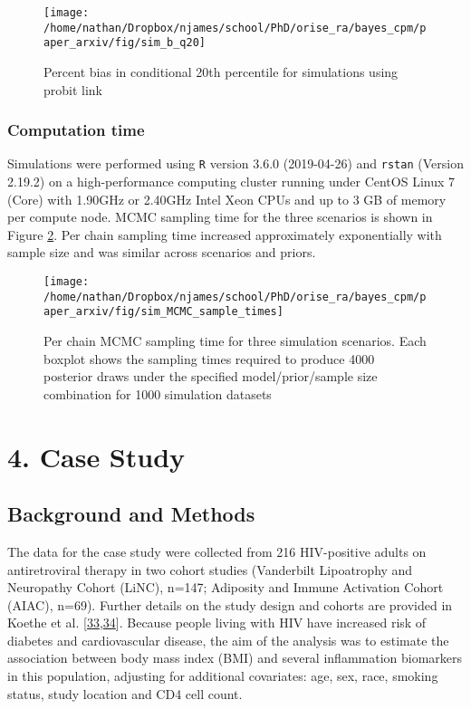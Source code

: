 \documentclass[
]{article}
\begin{document}
\begin{figure}

{\centering \texttt{[image: /home/nathan/Dropbox/njames/school/PhD/orise\_ra/bayes\_cpm/paper\_arxiv/fig/sim\_b\_q20]} 

}

\caption{Percent bias in conditional 20th percentile for simulations using probit link}\label{fig:simplt-q20-a}
\end{figure}

\hypertarget{computation-time}{%
\subsubsection{Computation time}\label{computation-time}}

Simulations were performed using \texttt{R} version 3.6.0 (2019-04-26) and \texttt{rstan} (Version 2.19.2) on a high-performance computing cluster running under CentOS Linux 7 (Core) with 1.90GHz or 2.40GHz Intel Xeon CPUs and up to 3 GB of memory per compute node. MCMC sampling time for the three scenarios is shown in Figure \ref{fig:simplt-samptime}. Per chain sampling time increased approximately exponentially with sample size and was similar across scenarios and priors.

\begin{figure}

{\centering \texttt{[image: /home/nathan/Dropbox/njames/school/PhD/orise\_ra/bayes\_cpm/paper\_arxiv/fig/sim\_MCMC\_sample\_times]} 

}

\caption{Per chain MCMC sampling time for three simulation scenarios. Each boxplot shows the sampling times required to produce 4000 posterior draws under the specified model/prior/sample size combination for 1000 simulation datasets}\label{fig:simplt-samptime}
\end{figure}

\hypertarget{case-study}{%
\section{4. Case Study}\label{case-study}}

\hypertarget{background-and-methods}{%
\subsection{Background and Methods}\label{background-and-methods}}

The data for the case study were collected from 216 HIV-positive adults on antiretroviral therapy in two cohort studies (Vanderbilt Lipoatrophy and Neuropathy Cohort (LiNC), n=147; Adiposity and Immune Activation Cohort (AIAC), n=69). Further details on the study design and cohorts are provided in Koethe et al. {[}\protect\hyperlink{ref-koethe_serum_2012}{33},\protect\hyperlink{ref-koethe_metabolic_2015}{34}{]}. Because people living with HIV have increased risk of diabetes and cardiovascular disease, the aim of the analysis was to estimate the association between body mass index (BMI) and several inflammation biomarkers in this population, adjusting for additional covariates: age, sex, race, smoking status, study location and CD4 cell count.
\end{document}
